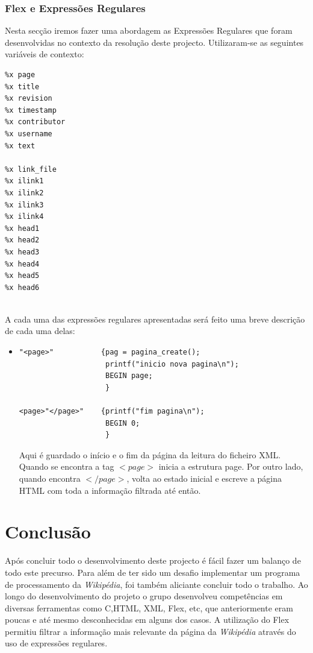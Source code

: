 \documentclass[11pt, a4paper, oneside]{article}
\begin{document}
\subsubsection{Flex e Expressões Regulares}

Nesta secção iremos fazer uma abordagem as Expressões Regulares que foram desenvolvidas no contexto da resolução deste projecto. Utilizaram-se as seguintes variáveis de contexto:

\begin{verbatim}
%x page
%x title
%x revision
%x timestamp
%x contributor
%x username
%x text

%x link_file
%x ilink1
%x ilink2
%x ilink3
%x ilink4
%x head1
%x head2
%x head3
%x head4
%x head5
%x head6


\end{verbatim}

A cada uma das expressões regulares apresentadas será feito uma breve descrição de cada uma delas:
\begin{itemize}
\item 
\begin{verbatim}
"<page>"           {pag = pagina_create();
                    printf("inicio nova pagina\n");
                    BEGIN page;
                    }

<page>"</page>"    {printf("fim pagina\n");
                    BEGIN 0;
                    }
\end{verbatim}

Aqui é guardado o início e o fim da página da leitura do ficheiro XML. Quando se encontra a tag \begin{math}<page>\end{math} inicia a estrutura page. Por outro lado, quando encontra \begin{math}</page>\end{math}, volta ao estado inicial e escreve a página HTML com toda a informação filtrada até então.



\end{itemize}


\newpage
\section{Conclusão}

Após concluir todo o desenvolvimento deste projecto é fácil fazer um balanço de todo este precurso. Para além de ter sido um desafio implementar um programa de processamento da \textit{Wikipédia}, foi também aliciante concluir todo o trabalho.
Ao longo do desenvolvimento do projeto o grupo desenvolveu competências em diversas ferramentas como C,HTML, XML, Flex, etc, que anteriormente eram poucas e até mesmo desconhecidas em alguns dos casos. 
A utilização do Flex permitiu filtrar a informação mais relevante da página da \textit{Wikipédia} através do uso de expressões regulares. 
\end{document}
